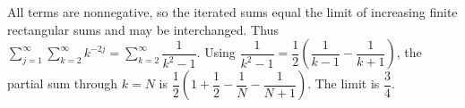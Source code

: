 All terms are nonnegative, so the iterated sums equal the limit of increasing finite rectangular sums and may be interchanged. Thus $\sum_{j=1}^{\infty}\sum_{k=2}^{\infty}k^{-2j}=\sum_{k=2}^{\infty}\dfrac{1}{k^2-1}$. Using $\dfrac{1}{k^2-1}=\dfrac{1}{2}(\dfrac{1}{k-1}-\dfrac{1}{k+1})$, the partial sum through $k=N$ is $\dfrac{1}{2}(1+\dfrac{1}{2}-\dfrac{1}{N}-\dfrac{1}{N+1})$. The limit is $\boxed{\dfrac{3}{4}}$.
